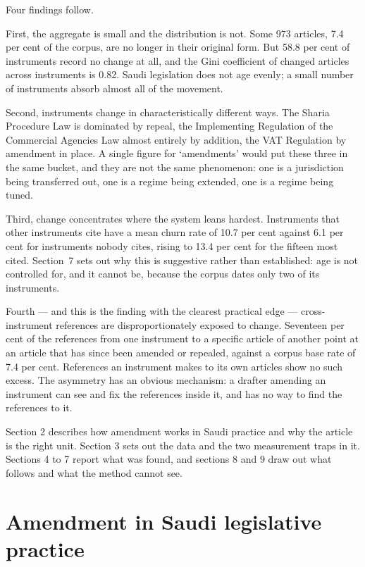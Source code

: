 \documentclass[11pt]{article}
\begin{document}
Four findings follow.

First, the aggregate is small and the distribution is not. Some 973 articles,
7.4 per cent of the corpus, are no longer in their original form. But 58.8 per
cent of instruments record no change at all, and the Gini coefficient of
changed articles across instruments is 0.82. Saudi legislation does not age
evenly; a small number of instruments absorb almost all of the movement.

Second, instruments change in characteristically different ways. The Sharia
Procedure Law is dominated by repeal, the Implementing Regulation of the
Commercial Agencies Law almost entirely by addition, the VAT Regulation by
amendment in place. A single figure for `amendments' would put these three
in the same bucket, and they are not the same phenomenon: one is a
jurisdiction being transferred out, one is a regime being extended, one is a
regime being tuned.

Third, change concentrates where the system leans hardest. Instruments that
other instruments cite have a mean churn rate of 10.7 per cent against 6.1
per cent for instruments nobody cites, rising to 13.4 per cent for the fifteen
most cited. Section~7 sets out why this is suggestive rather
than established: age is not controlled for, and it cannot be, because the
corpus dates only two of its instruments.

Fourth --- and this is the finding with the clearest practical edge ---
cross-instrument references are disproportionately exposed to change.
Seventeen per cent of the references from one instrument to a specific article
of another point at an article that has since been amended or repealed,
against a corpus base rate of 7.4 per cent. References an instrument makes to
its own articles show no such excess. The asymmetry has an obvious mechanism:
a drafter amending an instrument can see and fix the references inside it,
and has no way to find the references to it.

Section 2 describes how amendment works in Saudi practice and why the article
is the right unit. Section 3 sets out the data and the two measurement traps
in it. Sections 4 to 7 report what was found, and sections 8 and 9 draw out
what follows and what the method cannot see.

\section{Amendment in Saudi legislative practice}
\end{document}
